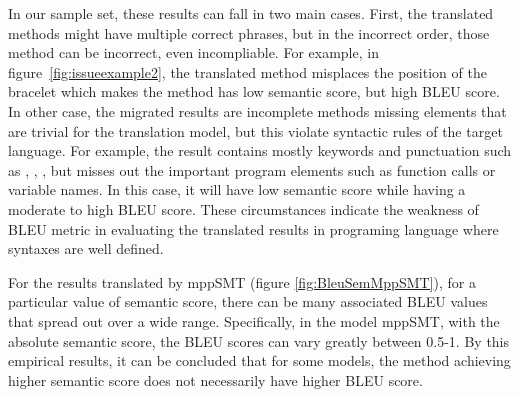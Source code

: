 In our sample set, these results can fall in two main cases. 
First, the translated methods might have multiple correct phrases, but in the 
incorrect order, those method can be incorrect, even incompliable.
%
For example, in figure~\ref{fig:issueexample2}, the translated method
misplaces the position of the bracelet which makes the method has low
semantic score, but high BLEU score. 
%
In other case, the migrated results are incomplete methods missing elements
that are trivial for the translation model, but this violate syntactic rules 
of the target language. For example, the result contains mostly keywords and
punctuation such as , , \code{()}, but misses
out the important program elements such as function calls or variable
names. In this case, it will have low semantic score while having
a moderate to high BLEU score. These circumstances indicate the weakness of BLEU metric 
in evaluating the translated results in programing language where syntaxes are well defined.

For the results translated by mppSMT (figure \ref{fig:BleuSemMppSMT}), 
for a particular value of  semantic score, there can be many associated 
BLEU values that spread out over a wide range. Specifically, in the model 
mppSMT, with the absolute semantic score, the BLEU scores can vary greatly 
between 0.5-1. By this empirical results, it can be concluded that for 
some models, the method achieving higher semantic score does not necessarily 
have higher BLEU score. 


